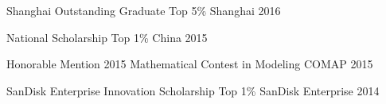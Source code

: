 



\begin{cvhonors}


\cvhonor
{Shanghai Outstanding Graduate} %
{Top 5\%} %
{Shanghai} %
{2016} %

\cvhonor
{National Scholarship} %
{Top 1\%} %
{China} %
{2015} %


\cvhonor
{Honorable Mention} %
{2015 Mathematical Contest in Modeling} %
{COMAP} %
{2015} %


\cvhonor
{SanDisk Enterprise Innovation Scholarship} %
{Top 1\%} %
{SanDisk Enterprise} %
{2014} %

\end{cvhonors}


